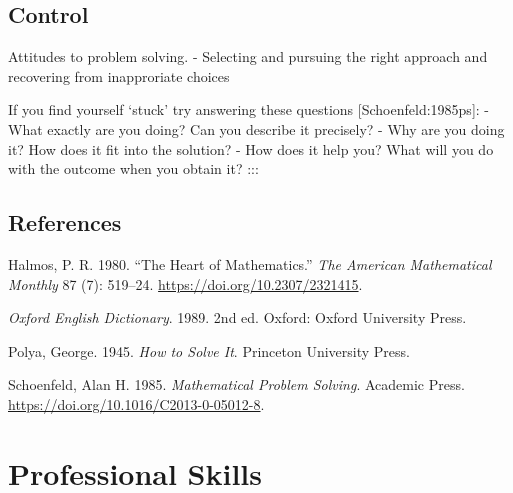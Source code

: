 \documentclass[
  a4paper,
  DIV=11,
  numbers=noendperiod,
  oneside]{scrreprt}
\newlength{\cslhangindent}
\newenvironment{CSLReferences}[2] %
 {\begin{list}{}{%
  \setlength{\itemindent}{0pt}
  \setlength{\leftmargin}{0pt}
  \setlength{\parsep}{0pt}
  \ifodd #1
   \setlength{\leftmargin}{\cslhangindent}
   \setlength{\itemindent}{-1\cslhangindent}
  \fi
  \setlength{\itemsep}{#2\baselineskip}}}
 {\end{list}}
\begin{document}
\chapter{Control}\label{sec-control}

Attitudes to problem solving. - Selecting and pursuing the right
approach and recovering from inapproriate choices

\begin{tcolorbox}[enhanced jigsaw, breakable, colframe=quarto-callout-important-color-frame, leftrule=.75mm, arc=.35mm, toptitle=1mm, rightrule=.15mm, left=2mm, colbacktitle=quarto-callout-important-color!10!white, bottomtitle=1mm, titlerule=0mm, bottomrule=.15mm, toprule=.15mm, coltitle=black, opacityback=0, title=\textcolor{quarto-callout-important-color}{\faExclamation}\hspace{0.5em}{Important}, opacitybacktitle=0.6, colback=white]

If you find yourself `stuck' try answering these questions
{[}Schoenfeld:1985ps{]}: - What exactly are you doing? Can you describe
it precisely? - Why are you doing it? How does it fit into the solution?
- How does it help you? What will you do with the outcome when you
obtain it? :::

\chapter*{References}\label{references}


\begingroup
\raggedright

\label{refs}
\begin{CSLReferences}{1}{0}
Halmos, P. R. 1980. {``The Heart of Mathematics.''} \emph{The American
Mathematical Monthly} 87 (7): 519--24.
\url{https://doi.org/10.2307/2321415}.

\emph{Oxford English Dictionary}. 1989. 2nd ed. Oxford: Oxford
University Press.

Polya, George. 1945. \emph{{How to Solve It}}. Princeton University
Press.

Schoenfeld, Alan H. 1985. \emph{Mathematical Problem Solving}. Academic
Press. \url{https://doi.org/10.1016/C2013-0-05012-8}.

\end{CSLReferences}

\endgroup

\part{Professional Skills}

\end{tcolorbox}
\end{document}
